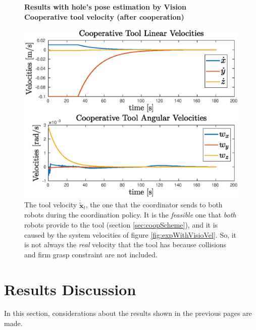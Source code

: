 \begin{figure}[H]
	\centering
	\textbf{Results with hole's pose estimation by Vision}\\
	\textbf{Cooperative tool velocity (after cooperation)}
	\vspace{20px}
	\centerline{
		\includegraphics[width=12.5cm]{withVisio/coopToolVel.eps}
	}
	\caption[Plots of cooperative tool velocity]{The tool velocity $\dot{\tilde{\boldsymbol{x}}}_t$, the one that the coordinator sends to both robots during the coordination policy. It is the \emph{feasible} one that \emph{both} robots provide to the tool (section \ref{sec:coopScheme}), and it is caused by the system velocities of figure \ref{fig:expWithVisioVel}. So, it is not always the \emph{real} velocity that the tool has because collisions and firm grasp constraint are not included.}
	\label{fig:expWithVisioVelTool}
\end{figure}



\section{Results Discussion}
In this section, considerations about the results shown in the previous pages are made.\\


